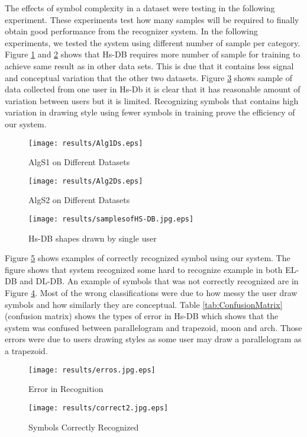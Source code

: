  The effects of symbol complexity in a dataset were testing in the following experiment. These experiments test how many samples will be required to finally obtain good performance from the recognizer system. In the following experiments, we tested the system using different number of sample per category. 
 Figure \ref{fig:Alg1Ds} and \ref{fig:Alg2Ds} shows that Hs-DB requires more number of sample for training to achieve same result as in other data sets. This is due that it contains less signal and conceptual variation that the other two datasets. Figure \ref{fig:samplesofHS-DB.jpg} shows sample of data collected from one user in Hs-Db it is clear that it has reasonable amount of variation between users but it is limited. Recognizing symbols that contains high variation in drawing style using fewer symbols in training prove the efficiency of our system.
 \begin{figure}
	\centering
		\texttt{[image: results/Alg1Ds.eps]}
	\caption{AlgS1 on Different Datasets}
	\label{fig:Alg1Ds}
\end{figure}
\begin{figure}
	\centering
		\texttt{[image: results/Alg2Ds.eps]}
	\caption{AlgS2 on Different Datasets }
	\label{fig:Alg2Ds}
\end{figure}
 \begin{figure}
	\centering
	\texttt{[image: results/samplesofHS-DB.jpg.eps]}
	\caption[Hs-DB Shapes Drawn by Single User]{Hs-DB shapes drawn by single user \cite{HeloiseBeautification} }
	\label{fig:samplesofHS-DB.jpg}
\end{figure}
  Figure \ref{fig:correct2.jpg} shows examples of correctly recognized symbol using our system. The figure shows that system recognized some hard to recognize example in both EL-DB and DL-DB. An example of symbols that was not correctly recognized are in Figure \ref{fig:erros}. Most of the wrong classifications were due to how messy the user draw symbols and how similarly they are conceptual. Table \ref{tab:ConfusionMatrix} (confusion matrix) shows the types of error in Hs-DB which shows that the system was confused between parallelogram and trapezoid, moon and arch. Those errors were due to users drawing styles as some user may draw a parallelogram as a trapezoid. 
  
\begin{figure}
	\centering
		\texttt{[image: results/erros.jpg.eps]}
	\caption{Error in Recognition }
	\label{fig:erros}
\end{figure}
\begin{figure}
	\centering
		\texttt{[image: results/correct2.jpg.eps]}
	\caption{Symbols Correctly Recognized}
	\label{fig:correct2.jpg}
\end{figure}

